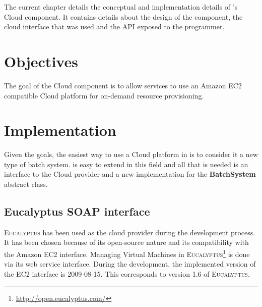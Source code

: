 
The current chapter details the conceptual and implementation details of \diet's Cloud
component. It contains details about the design of the component, the cloud interface
that was used and the API exposed to the \diet programmer.

\section{Objectives}

The goal of the Cloud component is to allow \diet services to use an Amazon EC2 compatible
Cloud platform for on-demand resource provisioning.

\section{Implementation}

Given the goals, the easiest way to use a Cloud platform in \diet is to consider it
a new type of batch system. \diet is easy to extend in this field and all that is needed
is an interface to the Cloud provider and a new implementation for the \textbf{BatchSystem}
abstract class.

\subsection{Eucalyptus SOAP interface}

\textsc{Eucalyptus} has been used as the cloud provider during the development process. It has
been chosen because of its open-source nature and its compatibility with the Amazon EC2 interface.
Managing Virtual Machines in \textsc{Eucalyptus}\footnote{\url{http://open.eucalyptus.com/}}
is done via its web service interface. During
the development, the implemented version of the EC2 interface is 2009-08-15. This corresponds to
version 1.6 of \textsc{Eucalyptus}.

